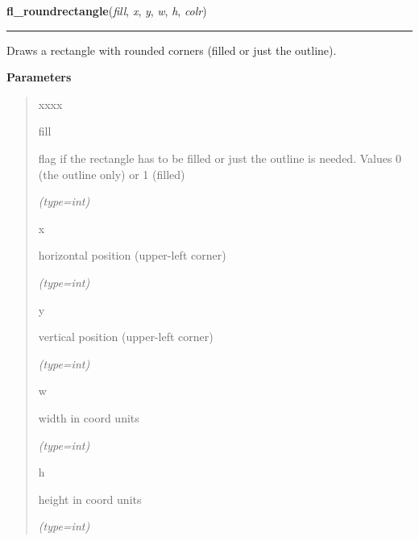     \label{xformslib:flxbasic:fl_roundrectangle}

    \vspace{0.5ex}

\hspace{.8\funcindent}\begin{boxedminipage}{\funcwidth}

    \raggedright \textbf{fl\_roundrectangle}(\textit{fill}, \textit{x}, \textit{y}, \textit{w}, \textit{h}, \textit{colr})

    \vspace{-1.5ex}

    \rule{\textwidth}{0.5\fboxrule}
\setlength{\parskip}{2ex}
    Draws a rectangle with rounded corners (filled or just the outline).

\setlength{\parskip}{1ex}
      \textbf{Parameters}
      \vspace{-1ex}

      \begin{quote}
        \begin{Ventry}{xxxx}

          \item[fill]

          flag if the rectangle has to be filled or just the outline is 
          needed. Values 0 (the outline only) or 1 (filled)

            {\it (type=int)}

          \item[x]

          horizontal position (upper-left corner)

            {\it (type=int)}

          \item[y]

          vertical position (upper-left corner)

            {\it (type=int)}

          \item[w]

          width in coord units

            {\it (type=int)}

          \item[h]

          height in coord units

            {\it (type=int)}


\end{Ventry}
\end{quote}
\end{boxedminipage}
